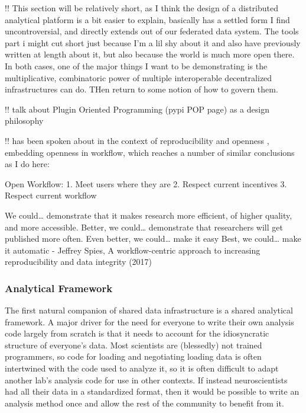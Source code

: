 \documentclass[10pt]{article}
\begin{document}
\begin{multicols}{2}
 !! This section will be relatively short, as I think the
design of a distributed analytical platform is a bit easier to explain,
basically has a settled form I find uncontroversial, and directly
extends out of our federated data system. The tools part i might cut
short just because I'm a lil shy about it and also have previously
written at length about it, but also because the world is much more open
there. In both cases, one of the major things I want to be demonstrating
is the multiplicative, combinatoric power of multiple interoperable
decentralized infrastructures can do. THen return to some notion of how
to govern them.

!! talk about Plugin Oriented Programming (pypi POP page) as a design
philosophy

!! has been spoken about in the context of reproducibility and openness
\cite{spiesWorkflowCentricApproachIncreasing2017} , embedding
openness in workflow, which reaches a number of similar conclusions as I
do here:

\begin{leftbar}
Open Workflow: 1. Meet users where they are 2. Respect current
incentives 3. Respect current workflow

We could\ldots{} demonstrate that it makes research more efficient, of
higher quality, and more accessible. Better, we could\ldots{}
demonstrate that researchers will get published more often. Even better,
we could\ldots{} make it easy Best, we could\ldots{} make it automatic -
Jeffrey Spies, A workflow-centric approach to increasing reproducibility
and data integrity (2017) \cite{spiesWorkflowCentricApproachIncreasing2017} 
\end{leftbar}

\hypertarget{analytical-framework}{%
\subsubsection{Analytical Framework}\label{analytical-framework}}

The first natural companion of shared data infrastructure is a shared
analytical framework. A major driver for the need for everyone to write
their own analysis code largely from scratch is that it needs to account
for the idiosyncratic structure of everyone's data. Most scientists are
(blessedly) not trained programmers, so code for loading and negotiating
loading data is often intertwined with the code used to analyze it, so
it is often difficult to adapt another lab's analysis code for use in
other contexts. If instead neuroscientists had all their data in a
standardized format, then it would be possible to write an analysis
method once and allow the rest of the community to benefit from it.


\end{multicols}
\end{document}
